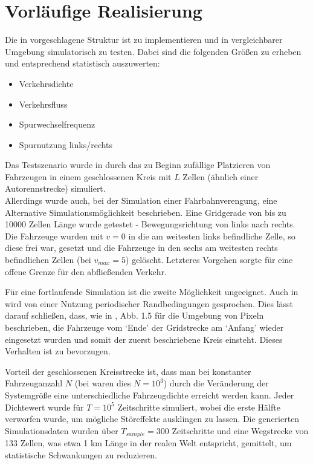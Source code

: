 \section{Vorläufige Realisierung}
\label{sec:realisierung}


Die in \cite{dat-ba} vorgeschlagene Struktur ist zu implementieren und in vergleichbarer Umgebung simulatorisch zu testen. 
Dabei sind die folgenden Größen zu erheben und entsprechend statistisch auszuwerten: 

\begin{itemize}
\item Verkehrsdichte
\item Verkehrsfluss
\item Spurwechselfrequenz
\item Spurnutzung links/rechts
\end{itemize}

Das Testszenario wurde in \cite{na-sch} durch das zu Beginn zufällige Platzieren von Fahrzeugen in einem geschlossenen Kreis mit $L$ Zellen (ähnlich einer Autorennstrecke) simuliert. \\
Allerdings wurde auch, bei der Simulation einer Fahrbahnverengung, eine Alternative Simulationsmöglichkeit beschrieben. 
Eine Gridgerade von bis zu 10000 Zellen Länge wurde getestet - Bewegungsrichtung von links nach rechts. 
Die Fahrzeuge wurden mit $v=0$ in die am weitesten links befindliche Zelle, so diese frei war, gesetzt und die Fahrzeuge in den sechs am weitesten rechts befindlichen Zellen (bei $v_{max}=5$) gelöscht. 
Letzteres Vorgehen sorgte für eine offene Grenze für den abfließenden Verkehr.

Für eine fortlaufende Simulation ist die zweite Möglichkeit ungeeignet. Auch in \cite{multi-lane} wird von einer Nutzung periodischer Randbedingungen gesprochen. 
Dies lässt darauf schließen, dass, wie in \cite{peri-rand}, Abb. 1.5 für die Umgebung von Pixeln beschrieben, die Fahrzeuge vom \enquote*{Ende} der Gridstrecke am \enquote*{Anfang} wieder eingesetzt wurden und somit der zuerst beschriebene Kreis einsteht.
Dieses Verhalten ist zu bevorzugen.

Vorteil der geschlossenen Kreisstrecke ist, dass man bei konstanter Fahrzeuganzahl $N$ (bei \cite{multi-lane} waren dies $N = 10^{3}$) durch die Veränderung der Systemgröße eine unterschiedliche Fahrzeugdichte erreicht werden kann. 
Jeder Dichtewert wurde für $T = 10^{5}$ Zeitschritte simuliert, wobei die erste Hälfte verworfen wurde, um mögliche Störeffekte ausklingen zu lassen. 
Die generierten Simulationsdaten wurden über $T_{sample} = 300$ Zeitschritte und eine Wegstrecke von 133 Zellen, was etwa 1 km Länge in der realen Welt entspricht, gemittelt, um statistische Schwankungen zu reduzieren.

